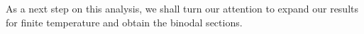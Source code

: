\documentclass[plainsections,a0]{sciposterlocal}
\begin{document}
\begin{multicols}{2}
As a next step on this analysis, we shall turn our attention to expand our results for finite temperature and obtain the binodal sections.

{ \footnotesize

}

\end{multicols}
\end{document}
